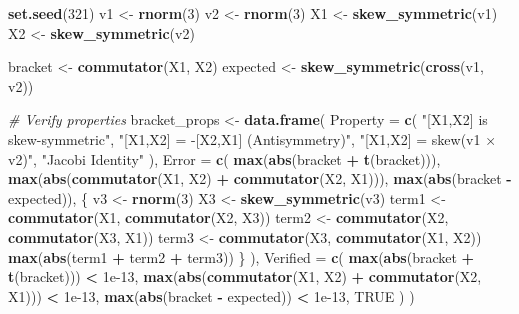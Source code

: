 \documentclass[
]{book}
\newenvironment{Shaded}{\begin{snugshade}}{\end{snugshade}}
\newcommand{\AttributeTok}[1]{\textcolor[rgb]{0.13,0.29,0.53}{#1}}
\newcommand{\CommentTok}[1]{\textcolor[rgb]{0.56,0.35,0.01}{\textit{#1}}}
\newcommand{\ConstantTok}[1]{\textcolor[rgb]{0.56,0.35,0.01}{#1}}
\newcommand{\DecValTok}[1]{\textcolor[rgb]{0.00,0.00,0.81}{#1}}
\newcommand{\FloatTok}[1]{\textcolor[rgb]{0.00,0.00,0.81}{#1}}
\newcommand{\FunctionTok}[1]{\textcolor[rgb]{0.13,0.29,0.53}{\textbf{#1}}}
\newcommand{\NormalTok}[1]{#1}
\newcommand{\OtherTok}[1]{\textcolor[rgb]{0.56,0.35,0.01}{#1}}
\newcommand{\SpecialCharTok}[1]{\textcolor[rgb]{0.81,0.36,0.00}{\textbf{#1}}}
\newcommand{\StringTok}[1]{\textcolor[rgb]{0.31,0.60,0.02}{#1}}
\theoremstyle{definition}
\theoremstyle{definition}
\theoremstyle{definition}
\theoremstyle{definition}
\theoremstyle{remark}
\begin{document}
\begin{Shaded}
\begin{Highlighting}[]
\FunctionTok{set.seed}\NormalTok{(}\DecValTok{321}\NormalTok{)}
\NormalTok{v1 }\OtherTok{\textless{}{-}} \FunctionTok{rnorm}\NormalTok{(}\DecValTok{3}\NormalTok{)}
\NormalTok{v2 }\OtherTok{\textless{}{-}} \FunctionTok{rnorm}\NormalTok{(}\DecValTok{3}\NormalTok{)}
\NormalTok{X1 }\OtherTok{\textless{}{-}} \FunctionTok{skew\_symmetric}\NormalTok{(v1)}
\NormalTok{X2 }\OtherTok{\textless{}{-}} \FunctionTok{skew\_symmetric}\NormalTok{(v2)}

\NormalTok{bracket }\OtherTok{\textless{}{-}} \FunctionTok{commutator}\NormalTok{(X1, X2)}
\NormalTok{expected }\OtherTok{\textless{}{-}} \FunctionTok{skew\_symmetric}\NormalTok{(}\FunctionTok{cross}\NormalTok{(v1, v2))}

\CommentTok{\# Verify properties}
\NormalTok{bracket\_props }\OtherTok{\textless{}{-}} \FunctionTok{data.frame}\NormalTok{(}
  \AttributeTok{Property =} \FunctionTok{c}\NormalTok{(}
    \StringTok{"[X1,X2] is skew{-}symmetric"}\NormalTok{,}
    \StringTok{"[X1,X2] = {-}[X2,X1] (Antisymmetry)"}\NormalTok{,}
    \StringTok{"[X1,X2] = skew(v1 × v2)"}\NormalTok{,}
    \StringTok{"Jacobi Identity"}
\NormalTok{  ),}
  \AttributeTok{Error =} \FunctionTok{c}\NormalTok{(}
    \FunctionTok{max}\NormalTok{(}\FunctionTok{abs}\NormalTok{(bracket }\SpecialCharTok{+} \FunctionTok{t}\NormalTok{(bracket))),}
    \FunctionTok{max}\NormalTok{(}\FunctionTok{abs}\NormalTok{(}\FunctionTok{commutator}\NormalTok{(X1, X2) }\SpecialCharTok{+} \FunctionTok{commutator}\NormalTok{(X2, X1))),}
    \FunctionTok{max}\NormalTok{(}\FunctionTok{abs}\NormalTok{(bracket }\SpecialCharTok{{-}}\NormalTok{ expected)),}
\NormalTok{    \{}
\NormalTok{      v3 }\OtherTok{\textless{}{-}} \FunctionTok{rnorm}\NormalTok{(}\DecValTok{3}\NormalTok{)}
\NormalTok{      X3 }\OtherTok{\textless{}{-}} \FunctionTok{skew\_symmetric}\NormalTok{(v3)}
\NormalTok{      term1 }\OtherTok{\textless{}{-}} \FunctionTok{commutator}\NormalTok{(X1, }\FunctionTok{commutator}\NormalTok{(X2, X3))}
\NormalTok{      term2 }\OtherTok{\textless{}{-}} \FunctionTok{commutator}\NormalTok{(X2, }\FunctionTok{commutator}\NormalTok{(X3, X1))}
\NormalTok{      term3 }\OtherTok{\textless{}{-}} \FunctionTok{commutator}\NormalTok{(X3, }\FunctionTok{commutator}\NormalTok{(X1, X2))}
      \FunctionTok{max}\NormalTok{(}\FunctionTok{abs}\NormalTok{(term1 }\SpecialCharTok{+}\NormalTok{ term2 }\SpecialCharTok{+}\NormalTok{ term3))}
\NormalTok{    \}}
\NormalTok{  ),}
  \AttributeTok{Verified =} \FunctionTok{c}\NormalTok{(}
    \FunctionTok{max}\NormalTok{(}\FunctionTok{abs}\NormalTok{(bracket }\SpecialCharTok{+} \FunctionTok{t}\NormalTok{(bracket))) }\SpecialCharTok{\textless{}} \FloatTok{1e{-}13}\NormalTok{,}
    \FunctionTok{max}\NormalTok{(}\FunctionTok{abs}\NormalTok{(}\FunctionTok{commutator}\NormalTok{(X1, X2) }\SpecialCharTok{+} \FunctionTok{commutator}\NormalTok{(X2, X1))) }\SpecialCharTok{\textless{}} \FloatTok{1e{-}13}\NormalTok{,}
    \FunctionTok{max}\NormalTok{(}\FunctionTok{abs}\NormalTok{(bracket }\SpecialCharTok{{-}}\NormalTok{ expected)) }\SpecialCharTok{\textless{}} \FloatTok{1e{-}13}\NormalTok{,}
    \ConstantTok{TRUE}
\NormalTok{  )}
\NormalTok{)}


\end{Highlighting}
\end{Shaded}
\end{document}
